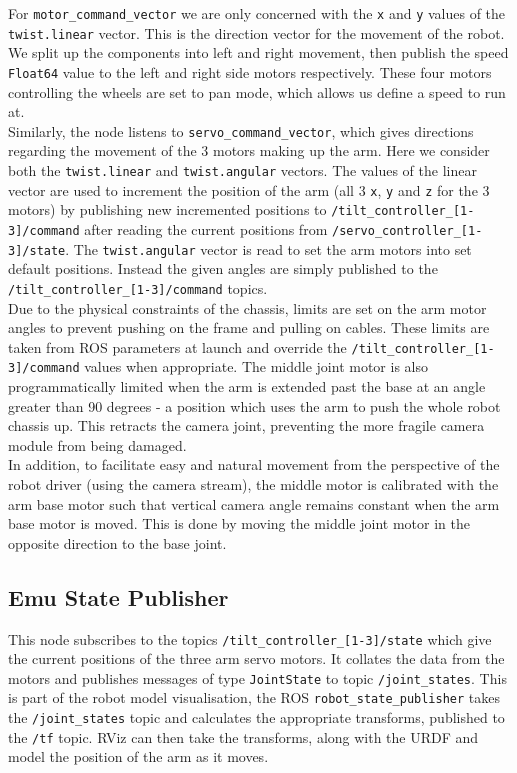 \documentclass[titlepage,12pt,a4paper]{article}
\begin{document}
\noindent For \texttt{motor\_command\_vector} we are only concerned with the \texttt{x} and \texttt{y} values of the \texttt{twist.linear} vector. This is the direction vector for the movement of the robot. We split up the components into left and right movement, then publish the speed \texttt{Float64} value to the left and right side motors respectively. These four motors controlling the wheels are set to pan mode, which allows us define a speed to run at.\\

\noindent Similarly, the node listens to \texttt{servo\_command\_vector}, which gives directions regarding the movement of the 3 motors making up the arm. Here we consider both the \texttt{twist.linear} and \texttt{twist.angular} vectors. The values of the linear vector are used to increment the position of the arm (all 3 \texttt{x}, \texttt{y} and \texttt{z} for the 3 motors) by publishing new incremented positions to \texttt{/tilt\_controller\_[1-3]/command} after reading the current positions from \texttt{/servo\_controller\_[1-3]/state}. The \texttt{twist.angular} vector is read to set the arm motors into set default positions. Instead the given angles are simply published to the \texttt{/tilt\_controller\_[1-3]/command} topics. \\

\noindent Due to the physical constraints of the chassis, limits are set on the arm motor angles to prevent pushing on the frame and pulling on cables. These limits are taken from ROS parameters at launch and override the \texttt{/tilt\_controller\_[1-3]/command} values when appropriate. The middle joint motor is also programmatically limited when the arm is extended past the base at an angle greater than 90 degrees - a position which uses the arm to push the whole robot chassis up. This retracts the camera joint, preventing the more fragile camera module from being damaged.\\

\noindent In addition, to facilitate easy and natural movement from the perspective of the robot driver (using the camera stream), the middle motor is calibrated with the arm base motor such that vertical camera angle remains constant when the arm base motor is moved. This is done by moving the middle joint motor in the opposite direction to the base joint.\\

\subsection{Emu State Publisher}
This node subscribes to the topics \texttt{/tilt\_controller\_[1-3]/state} which give the current positions of the three arm servo motors. It collates the data from the motors and publishes messages of type \texttt{JointState} to topic \texttt{/joint\_states}. This is part of the robot model visualisation, the ROS \texttt{robot\_state\_publisher} takes the \texttt{/joint\_states} topic and calculates the appropriate transforms, published to the \texttt{/tf} topic. RViz can then take the transforms, along with the URDF and model the position of the arm as it moves. \\
\end{document}
